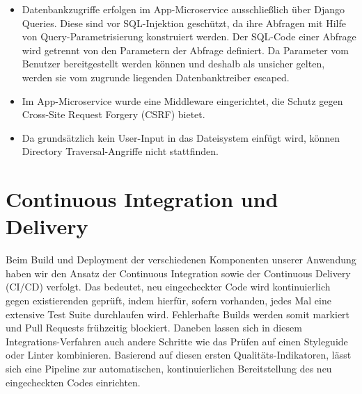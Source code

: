 \documentclass{article}
\begin{document}
\begin{itemize}
    \item Datenbankzugriffe erfolgen im App-Microservice ausschließlich über Django Queries. Diese sind vor SQL-Injektion geschützt, da ihre Abfragen mit Hilfe von Query-Parametrisierung konstruiert werden. Der SQL-Code einer Abfrage wird getrennt von den Parametern der Abfrage definiert. Da Parameter vom Benutzer bereitgestellt werden können und deshalb als unsicher gelten, werden sie vom zugrunde liegenden Datenbanktreiber escaped.~\cite{django-security}
    \item Im App-Microservice wurde eine Middleware eingerichtet, die Schutz gegen Cross-Site Request Forgery (CSRF) bietet.
    \item Da grundsätzlich kein User-Input in das Dateisystem einfügt wird, können Directory Traversal-Angriffe nicht stattfinden.
\end{itemize}




\section{Continuous Integration und Delivery} %

Beim Build und Deployment der verschiedenen Komponenten unserer Anwendung haben wir den Ansatz der Continuous Integration sowie der Continuous Delivery (CI/CD) verfolgt. Das bedeutet, neu eingecheckter Code wird kontinuierlich gegen existierenden geprüft, indem hierfür, sofern vorhanden, jedes Mal eine extensive Test Suite durchlaufen wird. Fehlerhafte Builds werden somit markiert und Pull Requests frühzeitig blockiert. Daneben lassen sich in diesem Integrations-Verfahren auch andere Schritte wie das Prüfen auf einen Styleguide oder Linter kombinieren. Basierend auf diesen ersten Qualitäts-Indikatoren, lässt sich eine Pipeline zur automatischen, kontinuierlichen Bereitstellung des neu eingecheckten Codes einrichten. 
\end{document}
